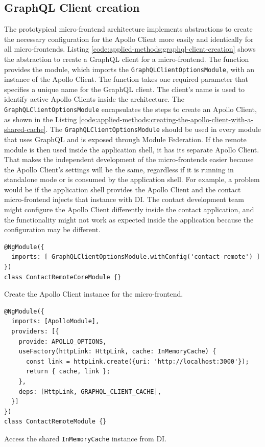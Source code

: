 \subsection{GraphQL Client creation}

\noindent The prototypical micro-frontend architecture implements abstractions to create the necessary configuration for the Apollo Client more easily and identically for all micro-frontends. Listing \ref{code:applied-methods:graphql-client-creation} shows the abstraction to create a GraphQL client for a micro-frontend. The function provides the module, which imports the \texttt{GraphQLClientOptionsModule}, with an instance of the Apollo Client. The function takes one required parameter that specifies a unique name for the GraphQL client. The client's name is used to identify active Apollo Clients inside the architecture. The \texttt{GraphQLClientOptionsModule} encapsulates the steps to create an Apollo Client, as shown in the Listing \ref{code:applied-methods:creating-the-apollo-client-with-a-shared-cache}. The \texttt{GraphQLClientOptionsModule} should be used in every module that uses GraphQL and is exposed through Module Federation. If the remote module is then used inside the application shell, it has its separate Apollo Client. That makes the independent development of the micro-frontends easier because the Apollo Client's settings will be the same, regardless if it is running in standalone mode or is consumed by the application shell. For example, a problem would be if the application shell provides the Apollo Client and the contact micro-frontend injects that instance with \ac{DI}. The contact development team might configure the Apollo Client differently inside the contact application, and the functionality might not work as expected inside the application because the configuration may be different.

\ifshowListings
  \begin{listing}[H]
    \begin{verbatim}
@NgModule({
  imports: [ GraphQLClientOptionsModule.withConfig('contact-remote') ]
})
class ContactRemoteCoreModule {}
  \end{verbatim}
  \caption{Create the Apollo Client instance for the micro-frontend.}\label{code:applied-methods:graphql-client-creation}
  \end{listing}
\fi

\ifshowListings
\begin{listing}[H]
\begin{verbatim}
@NgModule({
  imports: [ApolloModule],
  providers: [{
    provide: APOLLO_OPTIONS,
    useFactory(httpLink: HttpLink, cache: InMemoryCache) {
      const link = httpLink.create({uri: 'http://localhost:3000'});
      return { cache, link };
    },
    deps: [HttpLink, GRAPHQL_CLIENT_CACHE],
  }]
})
class ContactRemoteModule {}
\end{verbatim}
\caption{Access the shared \texttt{InMemoryCache} instance from \ac{DI}.}\label{code:applied-methods:creating-the-apollo-client-with-a-shared-cache}
\end{listing}
\fi

